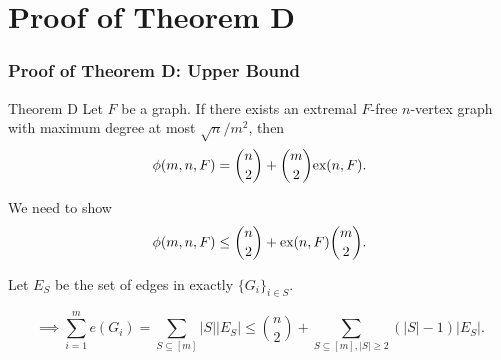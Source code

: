 \documentclass{beamer}
\newcommand*{\ex}{\textnormal{ex}}
\begin{document}










\section{Proof of Theorem D}

\begin{frame}
  \frametitle{Proof of Theorem D: Upper Bound}

  \begin{block}{Theorem D}
    Let $F$ be a graph. If there exists an extremal $F$-free $n$-vertex graph with maximum degree at most $\sqrt{n}/m^2$, then 
    \[ 
      \phi(m, n, F) = \binom{n}{2} + \binom{m}{2}\ex(n,F).
    \]
  \end{block}

  \pause

  We need to show
  \[  
    \phi(m, n ,F) \leq \binom{n}{2} + \ex(n, F)\binom{m}{2}.  
  \]

  \pause
  
  Let $E_S$ be the set of edges in exactly $\{G_i\}_{i \in S}$.

  \pause

  \[
    \implies \sum_{i = 1}^m e(G_i) = \sum_{S \subseteq [m]} |S||E_S| \leq \binom{n}{2} + \sum_{S \subseteq [m], |S| \geq 2} (|S| - 1)|E_S|.
  \]
\end{frame}
\end{document}
